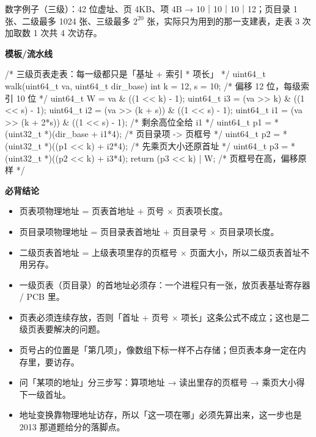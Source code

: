 \documentclass[10pt,a4paper]{ctexart}
\begin{document}
数字例子（三级）：42 位虚址、页 4KB、项 4B → 10｜10｜10｜12；页目录 1 张、二级最多 1024 张、三级最多 $2^{20}$ 张，实际只为用到的那一支建表，走表 3 次加取数 1 次共 4 次访存。


\textbf{模板/流水线}

\begin{codebox}
/* 三级页表走表：每一级都只是「基址 + 索引 * 项长」 */
uint64_t walk(uint64_t va, uint64_t dir_base) {
    int k = 12, s = 10;                 /* 偏移 12 位，每级索引 10 位 */
    uint64_t W  = va & ((1 << k) - 1);
    uint64_t i3 = (va >> k) & ((1 << s) - 1);
    uint64_t i2 = (va >> (k + s)) & ((1 << s) - 1);
    uint64_t i1 = (va >> (k + 2*s)) & ((1 << s) - 1);  /* 剩余高位全给 i1 */
    uint64_t p1 = *(uint32_t *)(dir_base + i1*4);      /* 页目录项 -> 页框号 */
    uint64_t p2 = *(uint32_t *)((p1 << k) + i2*4);     /* 先乘页大小还原首址 */
    uint64_t p3 = *(uint32_t *)((p2 << k) + i3*4);
    return (p3 << k) | W;               /* 页框号在高，偏移原样 */
}
\end{codebox}




\textbf{必背结论}

\begin{itemize}

\item 页表项物理地址 = 页表首地址 $+$ 页号 $\times$ 页表项长度。

\item 页目录项物理地址 = 页目录表首地址 $+$ 页目录号 $\times$ 页目录项长度。

\item 二级页表首地址 = 上级表项里存的页框号 $\times$ 页面大小，所以二级页表首址不用另存。

\item 一级页表（页目录）的首地址必须存：一个进程只有一张，放页表基址寄存器 / PCB 里。

\item 页表必须连续存放，否则「首址 + 页号 × 项长」这条公式不成立；这也是二级页表要解决的问题。

\item 页号占的位置是「第几项」，像数组下标一样不占存储；但页表本身一定在内存里，要访存。

\item 问「某项的地址」分三步写：算项地址 → 读出里存的页框号 → 乘页大小得下一级首址。

\item 地址变换靠物理地址访存，所以「这一项在哪」必须先算出来，这一步也是 2013 那道题给分的落脚点。

\end{itemize}
\end{document}
